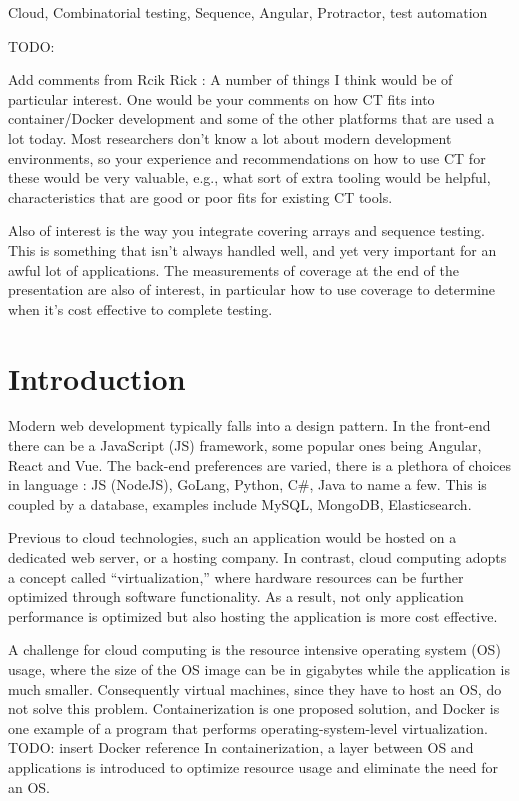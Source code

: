 \documentclass[conference]{IEEEtran}
\newcommand{\todo}[1]{}
\renewcommand{\todo}[1]{{\color{red} TODO: {#1}}}
\begin{document}
\begin{IEEEkeywords}
Cloud, Combinatorial testing, Sequence, Angular, Protractor, test automation
\end{IEEEkeywords}



\todo{ Add comments from Rcik 
Rick : A number of things I think would be of particular interest. 
One would be your comments on how CT fits into container/Docker development and some of the other platforms that are used a lot today. 
Most researchers don’t know a lot about modern development environments, so your experience and recommendations on how to use CT for these would be very valuable, e.g., 
what sort of extra tooling would be helpful, characteristics that are good or poor fits for existing CT tools.

Also of interest is the way you integrate covering arrays and sequence testing.
This is something that isn’t always handled well, and yet very important for an awful lot of applications.
The measurements of coverage at the end of the presentation are also of interest,
in particular how to use coverage to determine when it’s cost effective to complete testing.
}


\section{Introduction}
Modern web development typically falls into a design pattern. In the front-end there can be a JavaScript (JS) framework, some popular ones being Angular, React and Vue.
The back-end preferences are varied, there is a plethora of choices in language : JS (NodeJS), GoLang, Python, C\#, Java to name a few. 
This is coupled by a database, examples include MySQL, MongoDB, Elasticsearch.

Previous to cloud technologies, such an application would be hosted on a dedicated web server, or a hosting company.
In contrast, cloud computing adopts a concept called “virtualization,” where hardware resources can be further optimized through software functionality.
As a result, not only application performance is optimized but also hosting the application is more cost effective.

A challenge for cloud computing is the resource intensive operating system (OS) usage, where the size of the OS image can be in gigabytes while the application is much smaller. 
Consequently virtual machines, since they have to host an OS, do not solve this problem.
Containerization is one proposed solution, and Docker is one example of a program that performs operating-system-level virtualization. 
\todo {insert Docker reference}
In containerization, a layer between OS and applications is introduced to optimize resource usage and eliminate the need for an OS.
\end{document}
